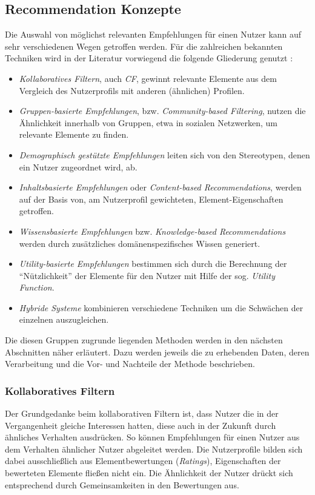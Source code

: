 \subsection{Recommendation Konzepte}\label{sec:concept}
Die Auswahl von möglichst relevanten Empfehlungen für einen Nutzer kann auf sehr verschiedenen Wegen getroffen werden. Für die zahlreichen bekannten Techniken wird in der Literatur vorwiegend die folgende Gliederung genutzt \citep[Kap. 1]{hb} \citep{Burke:2002:HRS:586321.586352} \citep{rs}:

\begin{itemize}
\item \textit{Kollaboratives Filtern}, auch \textit{\acf{CF}}, gewinnt relevante Elemente aus dem Vergleich des Nutzerprofils mit anderen  (ähnlichen) Profilen.
\item \textit{Gruppen-basierte Empfehlungen}, bzw. \textit{Community-based Filtering}, nutzen die Ähnlichkeit innerhalb von Gruppen, etwa in sozialen Netzwerken, um relevante Elemente zu finden.
\item \textit{Demographisch gestützte Empfehlungen} leiten sich von den Stereotypen, denen ein Nutzer zugeordnet wird, ab.
\item \textit{Inhaltsbasierte Empfehlungen} oder \textit{Content-based Recommendations}, werden auf der Basis von, am Nutzerprofil gewichteten, Element-Eigenschaften getroffen.
\item \textit{Wissensbasierte Empfehlungen} bzw. \textit{Knowledge-based Recommendations} werden durch zusätzliches domänenspezifisches Wissen generiert.
\item \textit{Utility-basierte Empfehlungen} bestimmen sich durch die Berechnung der ``Nützlichkeit'' der Elemente für den Nutzer mit Hilfe der sog. \textit{Utility Function}.
\item \textit{Hybride Systeme} kombinieren verschiedene Techniken um die Schwächen der einzelnen auszugleichen.
\end{itemize}

Die diesen Gruppen zugrunde liegenden Methoden werden in den nächsten Abschnitten näher erläutert. Dazu werden jeweils die zu erhebenden Daten, deren Verarbeitung und die Vor- und Nachteile der Methode beschrieben. %

\subsubsection{Kollaboratives Filtern}
\label{sec:cf_overview}
Der Grundgedanke beim kollaborativen Filtern ist, dass Nutzer die in der Vergangenheit gleiche Interessen hatten, diese auch in der Zukunft durch ähnliches Verhalten ausdrücken. So können Empfehlungen für einen Nutzer aus dem Verhalten ähnlicher Nutzer abgeleitet werden. Die Nutzerprofile bilden sich dabei ausschließlich aus Elementbewertungen (\textit{Ratings}), Eigenschaften der bewerteten Elemente fließen nicht ein.  Die Ähnlichkeit der Nutzer drückt sich entsprechend durch Gemeinsamkeiten in den Bewertungen aus. \citep[Kap. 2]{rs}

